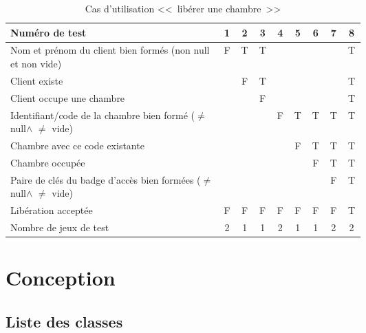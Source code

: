 \documentclass[11pt,article]{article}
\newcommand{\nullvalue}{\textsf{null}\xspace}
\begin{document}
        \begin{table}[htbp!]
            \begin{tabular}{|p{0.6\linewidth}|c|c|c|c|c|c|c|c|}
                \hline
                Numéro de test
                    &1&2&3&4&5&6&7&8\\
                \hline
                \hline
                Nom et prénom du client bien formés (non \nullvalue et non vide)
                    &F&T&T& & & & &T\\
                \hline
                Client existe
                    & &F&T& & & & &T\\
                \hline
                Client occupe une chambre
                    & & &F& & & & &T\\
                \hline
                \hline
                Identifiant/code de la chambre bien formé ($\neq$ \nullvalue $\land$ $\neq$ vide)
                    & & & &F&T&T&T&T\\
                \hline
                Chambre avec ce code existante
                    & & & & &F&T&T&T\\
                \hline
                Chambre occupée
                    & & & & & &F&T&T\\
                \hline
                Paire de clés du badge d'accès bien formées ($\neq$ \nullvalue $\land$ $\neq$ vide)
                    & & & & & & &F&T\\
                \hline
                \hline                Libération acceptée
                    &F&F&F&F&F&F&F&T\\
                \hline
                \hline
                Nombre de jeux de test
                    &2&1&1&2&1&1&2&2 \\
                \hline
            \end{tabular}
            \caption{Cas d'utilisation <<~libérer une chambre~>>}
        \end{table}
\newpage

\section{Conception}

\subsection{Liste des classes}
\end{document}

